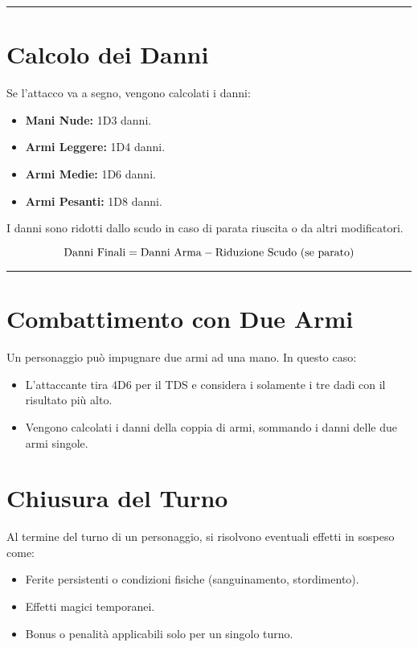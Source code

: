 \documentclass[../manuale_main.tex]{subfiles}
\begin{document}
\vspace{0.5cm}
\noindent
\begin{center}
\rule{\textwidth}{0.4pt} 
\end{center}
\vspace{0.5cm}

\section{Calcolo dei Danni}
Se l'attacco va a segno, vengono calcolati i danni:

\begin{itemize}
    \item \textbf{Mani Nude:} 1D3 danni.
    \item \textbf{Armi Leggere:} 1D4 danni.
    \item \textbf{Armi Medie:} 1D6 danni.
    \item \textbf{Armi Pesanti:} 1D8 danni.
\end{itemize}

I danni sono ridotti dallo scudo in caso di parata riuscita o da altri modificatori.

\[
\textnormal{Danni Finali} = \textnormal{Danni Arma} - \textnormal{Riduzione Scudo (se parato)}
\]

\vspace{0.5cm}
\noindent
\begin{center}
\rule{\textwidth}{0.4pt} 
\end{center}
\vspace{0.5cm}

\section{Combattimento con Due Armi}
Un personaggio può impugnare due armi ad una mano. In questo caso:

\begin{itemize}
    \item L'attaccante tira 4D6 per il TDS e considera i solamente i tre dadi con il risultato più alto.
    \item Vengono calcolati i danni della coppia di armi, sommando i danni delle due armi singole.
\end{itemize}

\section{Chiusura del Turno}

Al termine del turno di un personaggio, si risolvono eventuali effetti in sospeso come:
\begin{itemize}
  \item Ferite persistenti o condizioni fisiche (sanguinamento, stordimento).
  \item Effetti magici temporanei.
  \item Bonus o penalità applicabili solo per un singolo turno.
\end{itemize}
\end{document}
